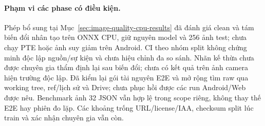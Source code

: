 \paragraph{Phạm vi các phase có điều kiện.} Phép bổ sung tại Mục~\ref{sec:image-quality-cpu-results} đã đánh giá clean và tám biến đổi nhân tạo trên ONNX CPU, giữ nguyên model và 256 ảnh test; chưa chạy PTE hoặc ảnh suy giảm trên Android. CI theo nhóm split không chứng minh độc lập nguồn/sự kiện và chưa hiệu chỉnh đa so sánh. Nhãn kế thừa chưa được chuyên gia thẩm định lại sau biến đổi; chưa có kết quả trên ảnh camera hiện trường độc lập. Đã kiểm lại gói tài nguyên E2E và mở rộng tìm raw qua working tree, ref/lịch sử và Drive; chưa phục hồi được các run Android/Web được nêu. Benchmark ảnh 32 JSON vẫn hợp lệ trong scope riêng, không thay thế E2E hay phiên đo lặp. Các khoảng trống URL/license/IAA, checksum split lúc train và xác nhận chuyên gia vẫn còn.
